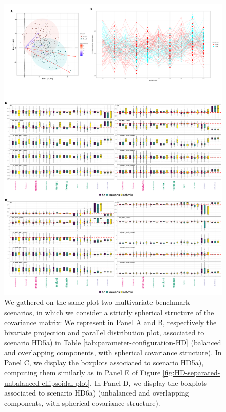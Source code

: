 \begin{figure}

{\centering \includegraphics[width=0.8\linewidth]{figs/HD/HD-overlapping-spherical} 

}

\caption{We gathered on the same plot two multivariate benchmark scenarios, in which we consider a strictly spherical structure of the covariance matrix:
We represent in Panel A and B, respectively the bivariate projection and parallel distribution plot, associated to scenario HD5a) in Table \ref{tab:parameter-configuration-HD}  (balanced and overlapping components, with spherical covariance structure).
In Panel C, we display the boxplots associated to scenario HD5a), computing them similarly as in Panel E of Figure \ref{fig:HD-separated-unbalanced-ellipsoidal-plot}.
In Panel D, we display the boxplots associated to scenario HD6a) (unbalanced and overlapping components, with spherical covariance structure).}\label{fig:HD-overlapping-spherical-plot}
\end{figure}

\newpage

